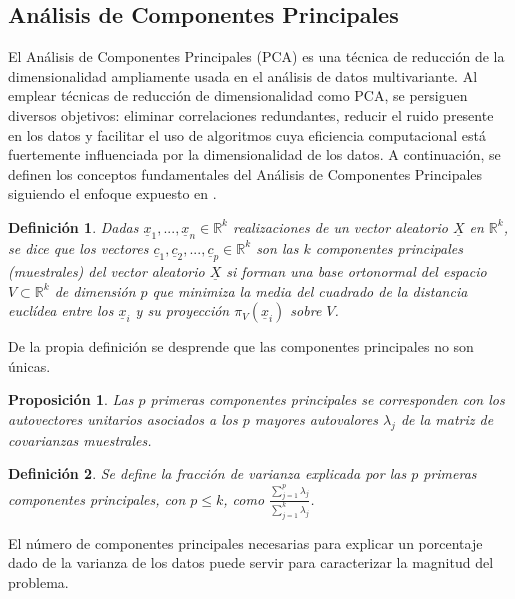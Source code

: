 \documentclass[12pt,a4paper,]{book}
\newcounter{dummy}
\numberwithin{dummy}{section}
\theoremstyle{ocrenumbox}
\theoremstyle{blacknumex}
\theoremstyle{blacknumbox}
\newtheorem{definitionT}{Definición}[section]  %
\theoremstyle{ocrenum}
\newtheorem{proposition}[dummy]{Proposición} %
\newenvironment{definition}{\begin{dBox}\begin{definitionT}}{\end{definitionT}\end{dBox}}
\theoremstyle{ocrenum}
\begin{document}
\hypertarget{anuxe1lisis-de-componentes-principales}{%
\subsection{Análisis de Componentes
Principales}\label{anuxe1lisis-de-componentes-principales}}

El Análisis de Componentes Principales (PCA) es una técnica de reducción
de la dimensionalidad ampliamente usada en el análisis de datos
multivariante. Al emplear técnicas de reducción de dimensionalidad como
PCA, se persiguen diversos objetivos: eliminar correlaciones
redundantes, reducir el ruido presente en los datos y facilitar el uso
de algoritmos cuya eficiencia computacional está fuertemente
influenciada por la dimensionalidad de los datos. A continuación, se
definen los conceptos fundamentales del Análisis de Componentes
Principales siguiendo el enfoque expuesto en \citet{PCAShaoDeng}.

\begin{definition}
Dadas $\underline x_1, ..., \underline x_n \in \mathbb{R}^k$ realizaciones de un vector aleatorio $\underline X$ en $\mathbb{R}^k$, se dice que los vectores $\underline c_1, \underline c_2,...,\underline c_p \in \mathbb{R}^k$ son las $k$ componentes principales (muestrales) del vector aleatorio $\underline X$ si forman una base ortonormal del espacio $V \subset \mathbb{R}^k$ de dimensión $p$ que minimiza la media del cuadrado de la distancia euclídea entre los $\underline x_i$ y su proyección $\pi_{V}(\underline x_i)$ sobre $V$.
\end{definition}

De la propia definición se desprende que las componentes principales no
son únicas.

\begin{proposition}
Las $p$ primeras componentes principales se corresponden con los autovectores unitarios asociados a los $p$ mayores autovalores $\lambda_j$ de la matriz de covarianzas muestrales. 
\end{proposition}

\begin{definition}
Se define la fracción de varianza explicada por las $p$ primeras componentes principales, con $p \le k$, como $\frac{\sum_{j=1}^p \lambda_j}{\sum_{j=1}^k \lambda_j}$.
\end{definition}

El número de componentes principales necesarias para explicar un
porcentaje dado de la varianza de los datos puede servir para
caracterizar la magnitud del problema.
\end{document}
